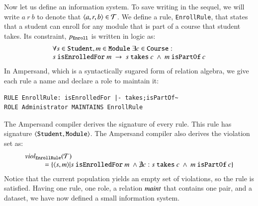 \documentclass{elsarticle}
\begin{document}
	Now let us define an information system.
	To save writing in the sequel, we will write $a\ r\ b$ to denote that $\langle{a},{r},{b}\rangle\in\mathcal{T}$.
	We define a rule, {\tt EnrollRule}, that states that a student can enroll for any module that is part of a course that student takes.
	Its constraint, $p_{\tt Enroll}$ is written in logic as:
\[\begin{array}{l}\forall s\in\text{\tt Student}, m\in\text{\tt Module}\ \exists c\in\text{\tt Course}:\\
s\ \text{\tt isEnrolledFor}\ m\ \rightarrow\ s\ \text{\tt takes}\ c\ \wedge\ m\ \text{\tt isPartOf}\ c
\end{array}\]
	In Ampersand, which is a syntactically sugared form of relation algebra,
	we give each rule a name and declare a role to maintain it:
\begin{verbatim}
RULE EnrollRule: isEnrolledFor |- takes;isPartOf~
ROLE Administrator MAINTAINS EnrollRule
\end{verbatim}
	The Ampersand compiler derives the signature of every rule.
	This rule has signature $\langle{\text{\tt Student}},{\text{\tt Module}}\rangle$.
	The Ampersand compiler also derives the violation set as:
\[\begin{array}{l}
	\viol{\text{\tt EnrollRule}}{\triples}\\
	\hspace{1cm}=\{\pair{s}{m}|s\ \text{\tt isEnrolledFor}\ m\ \wedge\not\exists c: s\ \text{\tt takes}\ c\ \wedge\ m\ \text{\tt isPartOf}\ c\}
\end{array}\]
	Notice that the current population yields an empty set of violations,
	so the rule is satisfied.
	Having one rule, one role, a relation $\text{\it maint\/}$ that contains one pair, and a dataset,
	we have now defined a small information system.
\end{document}
